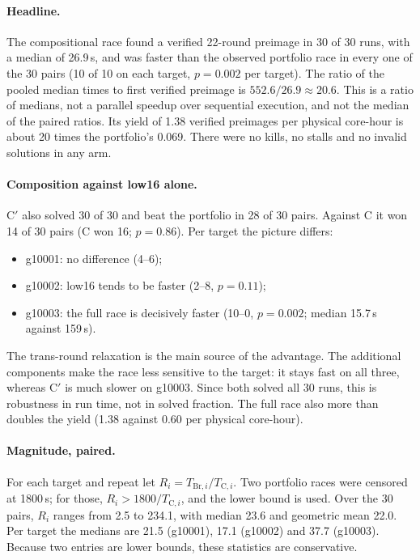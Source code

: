 \documentclass[11pt,a4paper]{article}
\begin{document}
\paragraph{Headline.} The compositional race found a verified 22-round preimage in 30 of 30 runs, with
a median of 26.9\,s, and was faster than the observed portfolio race in every one of the 30 pairs
(10 of 10 on each target, $p=0.002$ per target). The ratio of the pooled median times to first verified preimage is
$552.6/26.9\approx20.6$. This is a ratio of medians, not a parallel speedup over sequential execution,
and not the median of the paired ratios. Its yield of 1.38 verified preimages per physical core-hour
is about 20 times the portfolio's 0.069. There were no kills,
no stalls and no invalid solutions in any arm.

\paragraph{Composition against low16 alone.} C$'$ also solved 30 of 30 and beat the portfolio in 28
of 30 pairs. Against C it won 14 of 30 pairs (C won 16; $p=0.86$). Per target the picture differs:
\begin{itemize}
\item g10001: no difference (4--6);
\item g10002: low16 tends to be faster (2--8, $p=0.11$);
\item g10003: the full race is decisively faster (10--0, $p=0.002$; median 15.7\,s against 159\,s).
\end{itemize}
The trans-round relaxation is the main source of the advantage. The additional components make the
race less sensitive to the target: it stays fast on all three, whereas C$'$ is much slower on
g10003. Since both solved all 30 runs, this is robustness in run time, not in solved fraction. The
full race also more than doubles the yield (1.38 against 0.60 per physical core-hour).

\paragraph{Magnitude, paired.} For each target and repeat let $R_i=T_{\mathrm{Br},i}/T_{\mathrm{C},i}$.
Two portfolio races were censored at 1800\,s; for those, $R_i>1800/T_{\mathrm{C},i}$, and the lower
bound is used. Over the 30 pairs, $R_i$ ranges from 2.5 to 234.1, with median 23.6 and geometric
mean 22.0. Per target the medians are 21.5 (g10001), 17.1 (g10002) and 37.7 (g10003). Because two
entries are lower bounds, these statistics are conservative.
\end{document}
